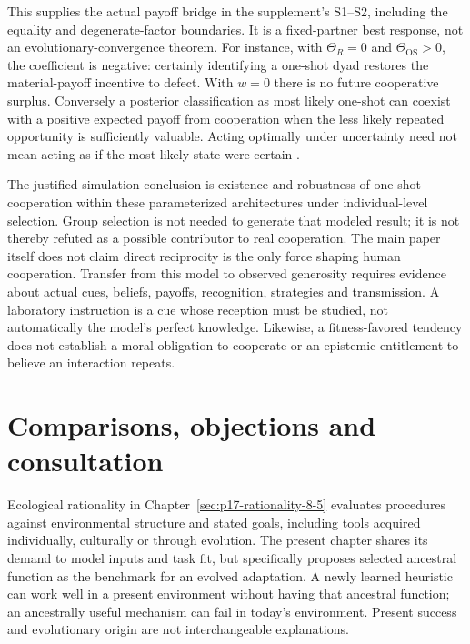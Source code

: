 This supplies the actual payoff bridge in the supplement's S1--S2,
including the equality and degenerate-factor boundaries. It is a
fixed-partner best response, not an evolutionary-convergence theorem.
For instance, with \(\Theta_R=0\) and
\(\Theta_{\mathrm{OS}}>0\), the coefficient is negative:
certainly identifying a one-shot dyad restores the material-payoff
incentive to defect. With \(w=0\) there is no future cooperative
surplus. Conversely a posterior classification as most likely one-shot
can coexist with a positive expected payoff from cooperation when
the less likely repeated opportunity is sufficiently valuable.
Acting optimally under uncertainty need not mean acting as if the
most likely state were certain
\cite[SI~pp.~3--4]{DeltonEtAl2011Reciprocity}.

The justified simulation conclusion is existence and robustness of
one-shot cooperation within these parameterized architectures under
individual-level selection. Group selection is not needed to generate
that modeled result; it is not thereby refuted as a possible contributor
to real cooperation. The main paper itself does not claim direct
reciprocity is the only force shaping human cooperation. Transfer from
this model to observed generosity requires evidence about actual cues,
beliefs, payoffs, recognition, strategies and transmission. A laboratory
instruction is a cue whose reception must be studied, not automatically
the model's perfect knowledge. Likewise, a fitness-favored tendency does
not establish a moral obligation to cooperate or an epistemic entitlement
to believe an interaction repeats.

\section{Comparisons, objections and consultation}
\label{sec:p11-rat106-comparison}

Ecological rationality in Chapter~\ref{sec:p17-rationality-8-5}
evaluates procedures against environmental structure and stated goals,
including tools acquired individually, culturally or through evolution.
The present chapter shares its demand to model inputs and task fit,
but specifically proposes selected ancestral function as the benchmark
for an evolved adaptation. A newly learned heuristic can work well in
a present environment without having that ancestral function; an
ancestrally useful mechanism can fail in today's environment. Present
success and evolutionary origin are not interchangeable explanations.

